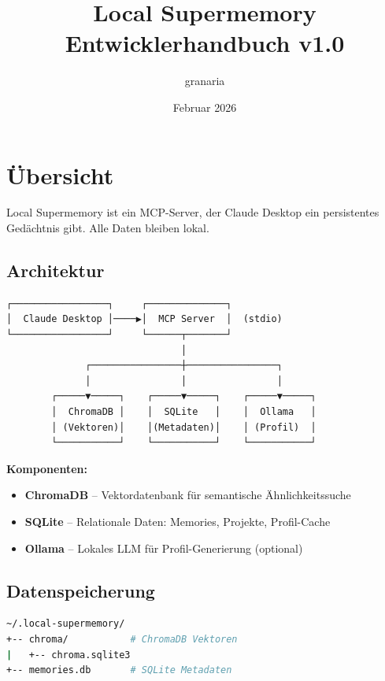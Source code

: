 \documentclass[11pt,a4paper]{article}
\title{\textbf{Local Supermemory}\\[0.5em]\large Entwicklerhandbuch v1.0}
\author{granaria}
\date{Februar 2026}
\begin{document}
\maketitle
\tableofcontents
\newpage

\section{Übersicht}

Local Supermemory ist ein MCP-Server, der Claude Desktop ein persistentes Gedächtnis gibt. Alle Daten bleiben lokal.

\subsection{Architektur}

\begin{verbatim}
┌─────────────────┐     ┌──────────────┐
│  Claude Desktop │────▶│  MCP Server  │  (stdio)
└─────────────────┘     └──────┬───────┘
                               │
              ┌────────────────┼────────────────┐
              │                │                │
        ┌─────▼─────┐    ┌─────▼─────┐    ┌─────▼─────┐
        │  ChromaDB │    │  SQLite   │    │  Ollama   │
        │ (Vektoren)│    │(Metadaten)│    │ (Profil)  │
        └───────────┘    └───────────┘    └───────────┘
\end{verbatim}

\textbf{Komponenten:}
\begin{itemize}
    \item \textbf{ChromaDB} -- Vektordatenbank für semantische Ähnlichkeitssuche
    \item \textbf{SQLite} -- Relationale Daten: Memories, Projekte, Profil-Cache
    \item \textbf{Ollama} -- Lokales LLM für Profil-Generierung (optional)
\end{itemize}

\subsection{Datenspeicherung}

\begin{lstlisting}[style=code,language=bash]
~/.local-supermemory/
+-- chroma/           # ChromaDB Vektoren
|   +-- chroma.sqlite3
+-- memories.db       # SQLite Metadaten
\end{lstlisting}
\end{document}
